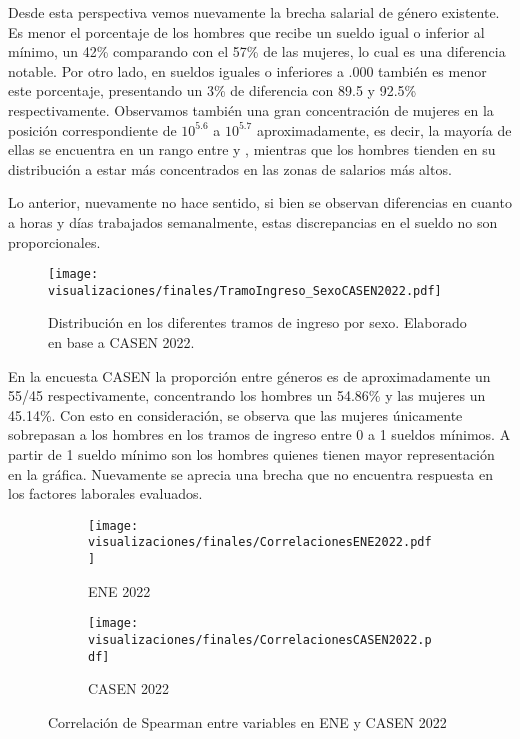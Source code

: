 \FloatBarrier

Desde esta perspectiva vemos nuevamente la brecha salarial de género existente. Es menor el porcentaje de los hombres que recibe un sueldo igual o inferior al mínimo, un 42\% comparando con el 57\% de las mujeres, lo cual es una diferencia notable. Por otro lado, en sueldos iguales o inferiores a .000 también es menor este porcentaje, presentando un 3\% de diferencia con 89.5 y 92.5\% respectivamente. Observamos también una gran concentración de mujeres en la posición correspondiente de $10^{5.6}$ a $10^{5.7}$ aproximadamente, es decir, la mayoría de ellas se encuentra en un rango entre  y , mientras que los hombres tienden en su distribución a estar más concentrados en las zonas de salarios más altos. 

Lo anterior, nuevamente no hace sentido, si bien se observan diferencias en cuanto a horas y días trabajados semanalmente, estas discrepancias en el sueldo no son proporcionales.

\FloatBarrier

\begin{figure}[htbp]
	\centering
	\texttt{[image: visualizaciones/finales/TramoIngreso\_SexoCASEN2022.pdf]}
	\caption{Distribución en los diferentes tramos de ingreso por sexo. Elaborado en base a CASEN 2022.}
	\label{07fig} 
\end{figure}

\FloatBarrier

En la encuesta CASEN la proporción entre géneros es de aproximadamente un 55/45 respectivamente, concentrando los hombres un 54.86\% y las mujeres un 45.14\%. Con esto en consideración, se observa que las mujeres únicamente sobrepasan a los hombres en los tramos de ingreso entre 0 a 1 sueldos mínimos. A partir de 1 sueldo mínimo son los hombres quienes tienen mayor representación en la gráfica. Nuevamente se aprecia una brecha que no encuentra respuesta en los factores laborales evaluados.

\FloatBarrier

\begin{figure}[htbp]
	\centering
	\begin{subfigure}[b]{0.49\textwidth}
		\centering
		\texttt{[image: visualizaciones/finales/CorrelacionesENE2022.pdf]}
		\caption{ENE 2022}
		\label{8a} 
	\end{subfigure}
	\hfill
	\begin{subfigure}[b]{0.49\textwidth}
		\centering
		\texttt{[image: visualizaciones/finales/CorrelacionesCASEN2022.pdf]}
		\caption{CASEN 2022}
		\label{8b}
	\end{subfigure}
	\caption{Correlación de Spearman entre variables en ENE y CASEN 2022}
	\label{08fig}
\end{figure}

